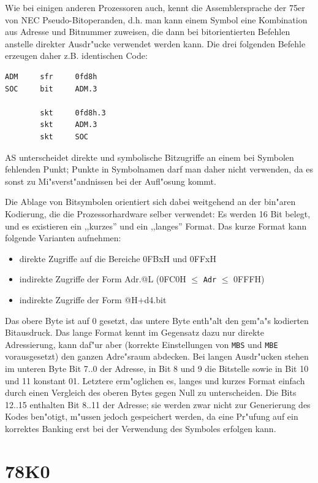 \documentclass[12pt,a4paper,twoside]{report}
\newcommand{\tty}[1]{{\tt #1}}
\newcommand{\asname}{AS}
\begin{document}
Wie bei einigen anderen Prozessoren auch, kennt die Assemblersprache
der 75er von NEC Pseudo-Bitoperanden, d.h. man kann einem Symbol
eine Kombination aus Adresse und Bitnummer zuweisen, die dann bei
bitorientierten Befehlen anstelle direkter Ausdr"ucke verwendet werden
kann.  Die drei folgenden Befehle erzeugen daher z.B. identischen
Code:
\begin{verbatim}
ADM     sfr     0fd8h
SOC     bit     ADM.3

        skt     0fd8h.3
        skt     ADM.3
        skt     SOC
\end{verbatim}
\asname{} unterscheidet direkte und symbolische Bitzugriffe an einem
bei Symbolen fehlenden Punkt; Punkte in Symbolnamen darf man daher
nicht verwenden, da es sonst zu Mi"sverst"andnissen bei der Aufl"osung
kommt.
\par
Die Ablage von Bitsymbolen orientiert sich dabei weitgehend an der
bin"aren Kodierung, die die Prozessorhardware selber verwendet:  Es
werden 16 Bit belegt, und es existieren ein ,,kurzes'' und ein ,,langes''
Format.  Das kurze Format kann folgende Varianten aufnehmen:
\begin{itemize}
 \item{direkte Zugriffe auf die Bereiche 0FBxH und 0FFxH}
 \item{indirekte Zugriffe der Form Adr.@L (0FC0H $\leq$ \tty{Adr} $\leq$ 0FFFH)}
 \item{indirekte Zugriffe der Form @H+d4.bit}
\end{itemize}
Das obere Byte ist auf 0 gesetzt, das untere Byte enth"alt den gem"a"s
\cite{NEC75} kodierten Bitausdruck.  Das lange Format kennt im Gegensatz
dazu nur direkte Adressierung, kann daf"ur aber (korrekte Einstellungen
von \tty{MBS} und \tty{MBE} vorausgesetzt) den ganzen Adre"sraum abdecken.
Bei langen Ausdr"ucken stehen im unteren Byte Bit 7..0 der Adresse, in
Bit 8 und 9 die Bitstelle sowie in Bit 10 und 11 konstant 01.  Letztere
erm"oglichen es, langes und kurzes Format einfach durch einen Vergleich
des oberen Bytes gegen Null zu unterscheiden.  Die Bits 12..15 enthalten
Bit 8..11 der Adresse; sie werden zwar nicht zur Generierung des Kodes
ben"otigt, m"ussen jedoch gespeichert werden, da eine Pr"ufung auf ein
korrektes Banking erst bei der Verwendung des Symboles erfolgen kann.


\section{78K0}
\label{78K0Spec}
\end{document}

